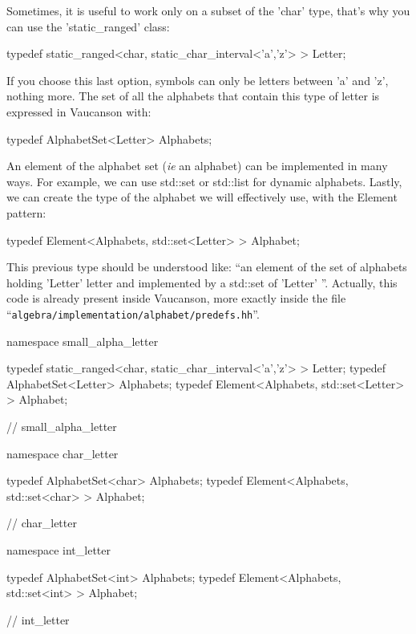 \documentclass{article}
\begin{document}
Sometimes, it is useful to work only on a subset of the 'char' type,
that's why you can use the 'static\_ranged' class:

\begin{code}
typedef static_ranged<char, static_char_interval<'a','z'> >  Letter;
\end{code}

If you choose this last option, symbols can only be letters between
'a' and 'z', nothing more. The set of all the alphabets that contain
this type of letter is expressed in Vaucanson with:

\begin{code}
typedef AlphabetSet<Letter>  Alphabets;
\end{code}

An element of the alphabet set (\textit{ie} an alphabet) can be
implemented in many ways. For example, we can use std::set or
std::list for dynamic alphabets. Lastly, we can create the type of
the alphabet we will effectively use, with the Element pattern:

\begin{code}
typedef Element<Alphabets, std::set<Letter> >  Alphabet;
\end{code}

This previous type should be understood like: ``an element of the set
of alphabets holding 'Letter' letter and implemented by a std::set of
'Letter' ''.  Actually, this code is already present inside Vaucanson,
more exactly inside the file ``\verb!algebra/implementation/alphabet/predefs.hh!''.

\begin{code}
 namespace small_alpha_letter {
      
      typedef static_ranged<char, static_char_interval<'a','z'> >  Letter;
      typedef AlphabetSet<Letter>                                  Alphabets;
      typedef Element<Alphabets, std::set<Letter> >                Alphabet;

    } // small_alpha_letter

    namespace char_letter {

      typedef AlphabetSet<char>                                    Alphabets;
      typedef Element<Alphabets, std::set<char> >                  Alphabet;

    } // char_letter

    namespace int_letter {

      typedef AlphabetSet<int>                                     Alphabets;
      typedef Element<Alphabets, std::set<int> >                   Alphabet;

    } // int_letter
\end{code}
\end{document}
